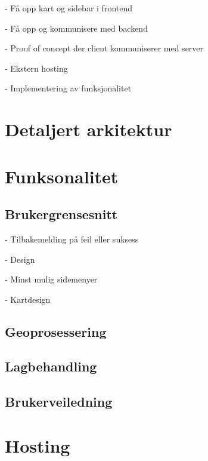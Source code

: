 - Få opp kart og sidebar i frontend

- Få opp og kommunisere med backend

- Proof of concept der client kommuniserer med server

- Ekstern hosting

- Implementering av funksjonalitet

\section{Detaljert arkitektur}

\section{Funksonalitet}

\subsection{Brukergrensesnitt}

- Tilbakemelding på feil eller suksess

- Design

- Minst mulig sidemenyer

- Kartdesign

\subsection{Geoprosessering}

\subsection{Lagbehandling}

\subsection{Brukerveiledning}

\section{Hosting}
